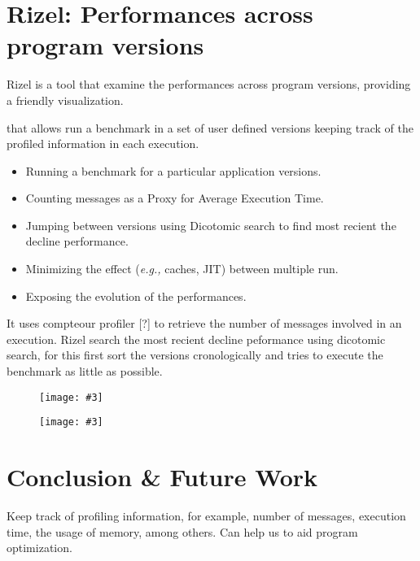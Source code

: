 \documentclass{sig-alternate}
\newcommand{\ab}[1]{\nb{Alexandre}{blue}{#1}}
\newcommand{\fig}[4]{
	\begin{figure}[#1]
		\centering
		\texttt{[image: \#3]}
		\caption{\label{fig:#3}#4}
	\end{figure}}
\newcommand{\eg}{\emph{e.g.,}\xspace}
\newcommand{\seclabel}[1]{\label{sec:#1}}
\newcommand{\figref}[1]{Figure~\ref{fig:#1}}
\begin{document}
\section{Rizel: Performances across program versions}\seclabel{solution}

Rizel is a tool that examine the performances across program versions, providing a friendly visualization. 

that allows run a benchmark in a set of user defined versions keeping track of the profiled information in each execution.


\begin{itemize}
\item Running a benchmark for a particular application versions.
\item Counting messages as a Proxy for Average Execution Time.
\item Jumping between versions using Dicotomic search to find most recient the decline performance.
\item Minimizing the effect (\eg caches, JIT) between multiple run.
\item Exposing the evolution of the performances.
\end{itemize}	

It uses compteour profiler [?] to retrieve the number of messages involved in an execution. Rizel search the most recient decline peformance using dicotomic search, for this first sort the versions cronologically and tries to execute the benchmark as little as possible. 

\fig{}{0.5}{picture1}{}
\fig{}{0.5}{picture2}{}


\section{Conclusion \& Future Work}\seclabel{conclusion}

Keep track of profiling information, for example, number of messages, execution time, the usage of memory, among others. Can help us to aid program optimization.
\end{document}
